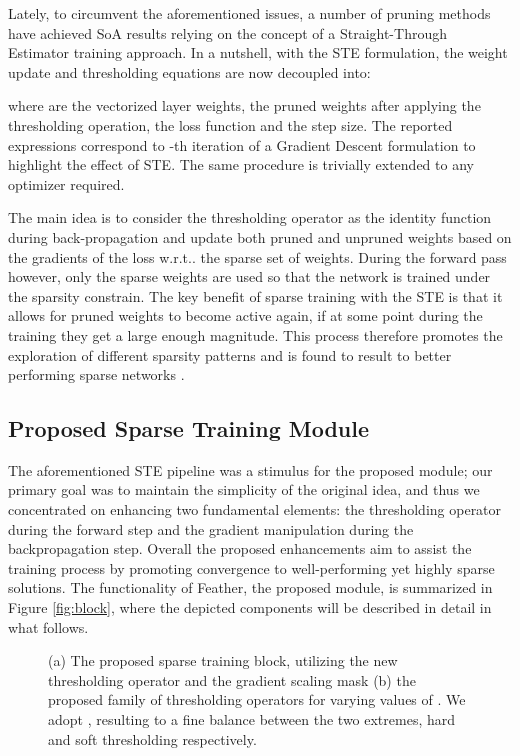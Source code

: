 \documentclass{article}
\makeatletter
\DeclareRobustCommand\onedot{\futurelet\@let@token\@onedot}
\def\@onedot{\ifx\@let@token.\else.\null\fi\xspace}
\def\wrt{{w.r.t}\onedot}
\makeatother
\begin{document}
Lately, to circumvent the aforementioned issues, a number of pruning methods \cite{retsinas2021online, jayakumar2020top, tai2022spartan, vanderschueren2023straight} have achieved SoA results relying on the concept of a Straight-Through Estimator \cite{bengio2013estimating} training approach. In a nutshell, with the STE formulation, the weight update and thresholding equations are now decoupled into: 

where  are the vectorized layer weights,  the pruned weights after applying the thresholding operation,  
 the loss function and  the step size.
The reported expressions correspond to -th iteration of a Gradient Descent formulation to highlight the effect of STE. The same procedure is trivially extended to any optimizer required.

The main idea is to consider the thresholding operator as the identity function during back-propagation and update both pruned and unpruned weights based on the gradients of the loss \wrt the sparse set of weights. During the forward pass however, only the sparse weights are used so that the network is trained under the sparsity constrain. The key benefit of sparse training with the STE is that it allows for pruned weights to become active again, if at some point during the training they get a large enough magnitude. This process therefore promotes the exploration of different sparsity patterns and is found to result to better performing sparse networks \cite{jayakumar2020top, tai2022spartan}.


\subsection{Proposed Sparse Training Module}

The aforementioned STE pipeline was a stimulus for the proposed module; 
our primary goal was to maintain the simplicity of the original idea, and thus we concentrated on enhancing two fundamental elements: the thresholding operator during the forward step and the gradient manipulation during the backpropagation step.
Overall the proposed enhancements aim to assist the training process by promoting convergence to well-performing yet highly sparse solutions.
The functionality of Feather, the proposed module, is summarized in Figure \ref{fig:block}, where the depicted components will be described in detail in what follows.  


\begin{figure}[tp]
\begin{center}
\caption{(a) The proposed sparse training block, utilizing the new thresholding operator and the gradient scaling mask (b) the proposed family of thresholding operators for varying values of . We adopt , resulting to a fine balance between the two extremes, hard and soft thresholding respectively.}
\end{center}
\end{figure}
\end{document}
